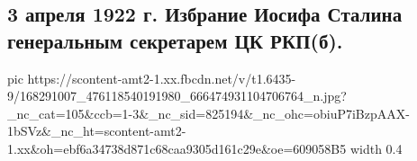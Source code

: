  
 
 
 
 

\subsection{3 апреля 1922 г. Избрание Иосифа Сталина генеральным секретарем ЦК РКП(б).}


\ifcmt
  pic https://scontent-amt2-1.xx.fbcdn.net/v/t1.6435-9/168291007_476118540191980_666474931104706764_n.jpg?_nc_cat=105&ccb=1-3&_nc_sid=825194&_nc_ohc=obiuP7iBzpAAX-1bSVz&_nc_ht=scontent-amt2-1.xx&oh=ebf6a34738d871c68caa9305d161c29e&oe=609058B5
  width 0.4
\fi

